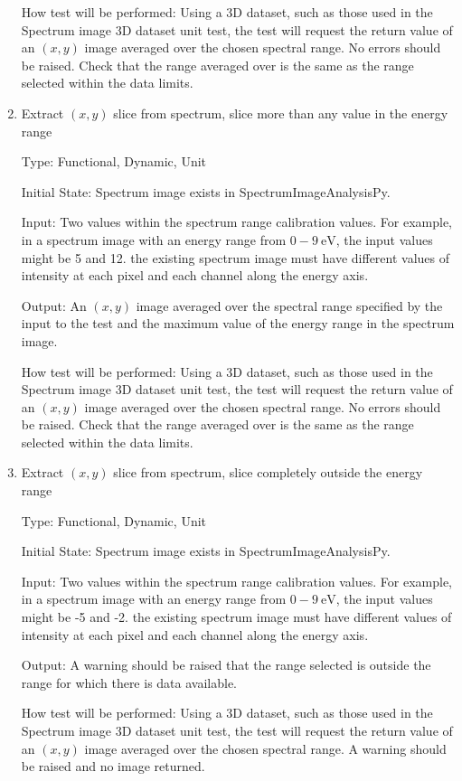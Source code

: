 \documentclass[12pt, titlepage]{article}
\newcommand{\progname}{SpectrumImageAnalysisPy}
\begin{document}
\begin{enumerate}
How test will be performed: Using a 3D dataset, such as those used in the
Spectrum image 3D dataset unit test, the test will request the return value of
an $(x,y)$ image averaged over the chosen spectral range. No errors should be
raised. Check that the range averaged over is the same as the range selected
within the data limits.


\item{Extract $(x,y)$ slice from spectrum, slice more than any value in the
energy range}

Type: Functional, Dynamic, Unit

Initial State: Spectrum image exists in \progname{}.

Input: Two values within the spectrum range calibration values. For example, in
a spectrum image with an energy range from $0-9\ \si{\electronvolt}$, the input
values might be 5 and 12. the existing spectrum image must have different values
of intensity at each pixel and each channel along the energy axis.

Output: An $(x,y)$ image averaged over the spectral range specified by the input
to the test and the maximum value of the energy range in the spectrum image.

How test will be performed: Using a 3D dataset, such as those used in the
Spectrum image 3D dataset unit test, the test will request the return value of
an $(x,y)$ image averaged over the chosen spectral range. No errors should be
raised. Check that the range averaged over is the same as the range selected
within the data limits.


\item{Extract $(x,y)$ slice from spectrum, slice completely outside the energy
range}

Type: Functional, Dynamic, Unit

Initial State: Spectrum image exists in \progname{}.

Input: Two values within the spectrum range calibration values. For example, in
a spectrum image with an energy range from $0-9\ \si{\electronvolt}$, the input
values might be -5 and -2. the existing spectrum image must have different
values of intensity at each pixel and each channel along the energy axis.

Output: A warning should be raised that the range selected is outside the range
for which there is data available.

How test will be performed: Using a 3D dataset, such as those used in the
Spectrum image 3D dataset unit test, the test will request the return value of
an $(x,y)$ image averaged over the chosen spectral range. A warning should be
raised and no image returned.



\end{enumerate}
\end{document}
